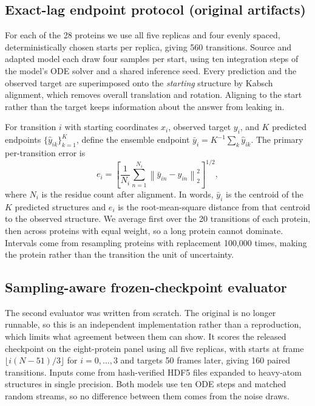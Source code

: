 \documentclass{article}
\begin{document}
\subsection{Exact-lag endpoint protocol (original artifacts)}

For each of the 28 proteins we use all five replicas and four evenly spaced, deterministically chosen starts per replica, giving 560 transitions. Source and adapted model each draw four samples per start, using ten integration steps of the model's ODE solver and a shared inference seed. Every prediction and the observed target are superimposed onto the \emph{starting} structure by Kabsch alignment, which removes overall translation and rotation. Aligning to the start rather than the target keeps information about the answer from leaking in.

For transition $i$ with starting coordinates $x_i$, observed target $y_i$, and $K$ predicted endpoints $\{\hat{y}_{ik}\}_{k=1}^{K}$, define the ensemble endpoint $\bar{y}_i = K^{-1}\sum_k \hat{y}_{ik}$. The primary per-transition error is
\begin{equation}
e_i = \left[\frac{1}{N_i}\sum_{n=1}^{N_i}\left\|\bar{y}_{in}-y_{in}\right\|_2^2\right]^{1/2},
\end{equation}
where $N_i$ is the residue count after alignment. In words, $\bar{y}_i$ is the centroid of the $K$ predicted structures and $e_i$ is the root-mean-square distance from that centroid to the observed structure. We average first over the 20 transitions of each protein, then across proteins with equal weight, so a long protein cannot dominate. Intervals come from resampling proteins with replacement 100{,}000 times, making the protein rather than the transition the unit of uncertainty.

\subsection{Sampling-aware frozen-checkpoint evaluator}
\label{sec:evaluator}

The second evaluator was written from scratch. The original is no longer runnable, so this is an independent implementation rather than a reproduction, which limits what agreement between them can show. It scores the released checkpoint on the eight-protein panel using all five replicas, with starts at frame $\lfloor i(N-51)/3 \rfloor$ for $i = 0,\dots,3$ and targets 50 frames later, giving 160 paired transitions. Inputs come from hash-verified HDF5 files expanded to heavy-atom structures in single precision. Both models use ten ODE steps and matched random streams, so no difference between them comes from the noise draws.
\end{document}
